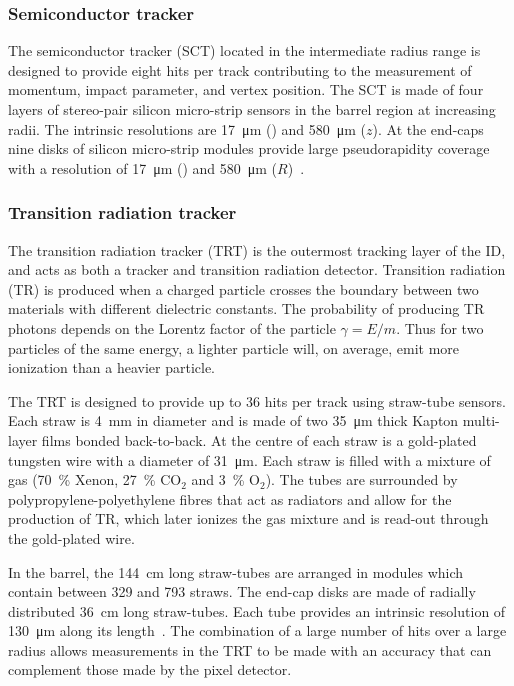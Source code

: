 \subsubsection{Semiconductor tracker}
The semiconductor tracker (SCT) located in the intermediate radius range is designed to provide eight hits per track contributing to the measurement of momentum, impact parameter, and vertex position. The SCT is made of four layers of stereo-pair silicon micro-strip sensors in the barrel region at increasing radii. The intrinsic resolutions are \SI{17}{\um} (\rphi) and \SI{580}{\um} ($z$). At the end-caps nine disks of silicon micro-strip modules provide large pseudorapidity coverage with a resolution of \SI{17}{\um} (\rphi) and \SI{580}{\um} ($R$)~\cite{Detector:ATLASExperimentGeneral}.

\subsubsection{Transition radiation tracker}
The transition radiation tracker (TRT) is the outermost tracking layer of the ID, and acts as both a tracker and transition radiation detector. Transition radiation (TR) is produced when a charged particle crosses the boundary between two materials with different dielectric constants. The probability of producing TR photons depends on the Lorentz factor of the particle $\gamma=E/m$. Thus for two particles of the same energy, a lighter particle will, on average, emit more ionization than a heavier particle.

The TRT is designed to provide up to \num{36} hits per track using straw-tube sensors. Each straw is \SI{4}{\mm} in diameter and is made of two \SI{35}{\micro\meter} thick Kapton multi-layer films bonded back-to-back. At the centre of each straw is a gold-plated tungsten wire with a diameter of \SI{31}{\micro\meter}. Each straw is filled with a mixture of gas (\SI{70}{\percent} Xenon, \SI{27}{\percent} $\textrm{CO}_{2}$ and \SI{3}{\percent} $\textrm{O}_2$). The tubes are surrounded by polypropylene-polyethylene fibres that act as radiators and allow for the production of TR, which later ionizes the gas mixture and is read-out through the gold-plated wire.

In the barrel, the \SI{144}{\cm} long straw-tubes are arranged in modules which contain between \num{329} and \num{793} straws. The end-cap disks are made of radially distributed \SI{36}{\cm} long straw-tubes. Each tube provides an intrinsic resolution of \SI{130}{\um} along its length~\cite{Detector:ATLASExperimentGeneral}. The combination of a large number of hits over a large radius allows measurements in the TRT to be made with an accuracy that can complement those made by the pixel detector.

